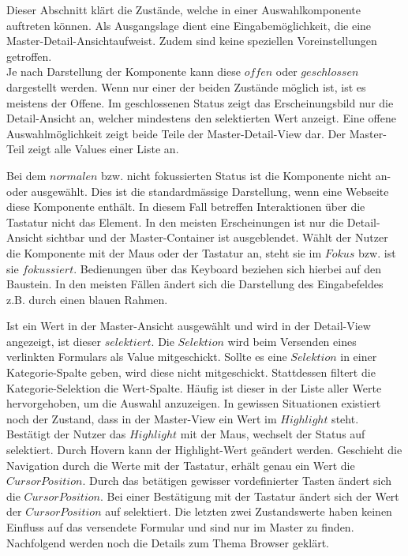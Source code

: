 Dieser Abschnitt klärt die Zustände, welche in einer Auswahlkomponente auftreten können.
Als Ausgangslage dient eine Eingabemöglichkeit, die eine Master-Detail-Ansicht\footnotemark aufweist.
Zudem sind keine speziellen Voreinstellungen getroffen.
\\
Je nach Darstellung der Komponente kann diese $offen$ oder $geschlossen$ dargestellt werden.
Wenn nur einer der beiden Zustände möglich ist, ist es meistens der Offene.
Im geschlossenen Status zeigt das Erscheinungsbild nur die Detail-Ansicht an, welcher mindestens den selektierten Wert anzeigt.
Eine offene Auswahlmöglichkeit zeigt beide Teile der Master-Detail-View dar.
Der Master-Teil zeigt alle Values einer Liste an.

Bei dem $normalen$ bzw. nicht fokussierten Status ist die Komponente nicht an- oder ausgewählt.
Dies ist die standardmässige Darstellung, wenn eine Webseite diese Komponente enthält.
In diesem Fall betreffen Interaktionen über die Tastatur nicht das Element. %
In den meisten Erscheinungen ist nur die Detail-Ansicht sichtbar und der Master-Container ist ausgeblendet.
Wählt der Nutzer die Komponente mit der Maus oder der Tastatur an, steht sie im $Fokus$ bzw. ist sie $fokussiert$.
Bedienungen über das Keyboard beziehen sich hierbei auf den Baustein.
In den meisten Fällen ändert sich die Darstellung des Eingabefeldes z.B. durch einen blauen Rahmen.

Ist ein Wert in der Master-Ansicht ausgewählt und wird in der Detail-View angezeigt, ist dieser $selektiert$.
Die $Selektion$ wird beim Versenden eines verlinkten Formulars als Value mitgeschickt.
Sollte es eine $Selektion$ in einer Kategorie-Spalte geben, wird diese nicht mitgeschickt.
Stattdessen filtert die Kategorie-Selektion die Wert-Spalte.
Häufig ist dieser in der Liste aller Werte hervorgehoben, um die Auswahl anzuzeigen.
In gewissen Situationen existiert noch der Zustand, dass in der Master-View ein Wert im $Highlight$ steht. 
Bestätigt der Nutzer das $Highlight$ mit der Maus, wechselt der Status auf selektiert.
Durch Hovern kann der Highlight-Wert geändert werden. %
Geschieht die Navigation durch die Werte mit der Tastatur, erhält genau ein Wert die $Cursor Position$. 
Durch das betätigen gewisser vordefinierter Tasten ändert sich die $Cursor Position$.
Bei einer Bestätigung mit der Tastatur ändert sich der Wert der $Cursor Position$ auf selektiert.
Die letzten zwei Zustandswerte haben keinen Einfluss auf das versendete Formular und sind nur im Master zu finden.
Nachfolgend werden noch die Details zum Thema Browser geklärt.


